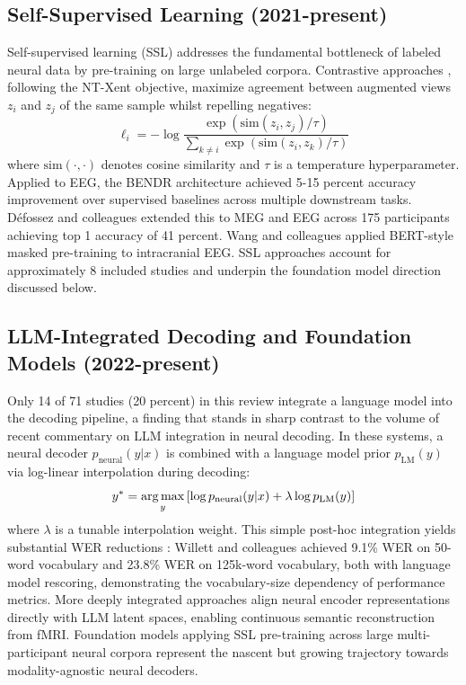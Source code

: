 \subsection{Self-Supervised Learning (2021-present)}

Self-supervised learning (SSL) addresses the fundamental bottleneck of labeled neural data by pre-training on large unlabeled corpora. Contrastive approaches \cite{Chen2020}, following the NT-Xent objective, maximize agreement between augmented views $z_i$ and $z_j$ of the same sample whilst repelling negatives:
\begin{equation}
\ell_i = -\log \frac{\exp(\text{sim}(z_i, z_j) / \tau)}{\sum_{k \neq i} \exp(\text{sim}(z_i, z_k) / \tau)}
\end{equation}
where $\text{sim}(\cdot, \cdot)$ denotes cosine similarity and $\tau$ is a temperature hyperparameter. Applied to EEG, the BENDR architecture \cite{Kostas2021} achieved 5-15 percent accuracy improvement over supervised baselines across multiple downstream tasks. Défossez and colleagues \cite{Defossez2023} extended this to MEG and EEG across 175 participants achieving top 1 accuracy of 41 percent. Wang and colleagues \cite{Wang2023BrainBERT} applied BERT-style masked pre-training to intracranial EEG. SSL approaches account for approximately 8 included studies and underpin the foundation model direction discussed below.

\subsection{LLM-Integrated Decoding and Foundation Models (2022-present)}

Only 14 of 71 studies (20 percent) in this review integrate a language model into the decoding pipeline, a finding that stands in sharp contrast to the volume of recent commentary on LLM integration in neural decoding. In these systems, a neural decoder $p_{\text{neural}}(y|x)$ is combined with a language model prior $p_{\text{LM}}(y)$ via log-linear interpolation during decoding:
\begin{equation}
y^* = \operatorname*{arg\,max}_y \left[ \log p_{\text{neural}}(y|x) + \lambda \log p_{\text{LM}}(y) \right]
\end{equation}
where $\lambda$ is a tunable interpolation weight. This simple post-hoc integration yields substantial WER reductions \cite{Kaplan2020}: Willett and colleagues \cite{Willett2023} achieved 9.1\% WER on 50-word vocabulary and 23.8\% WER on 125k-word vocabulary, both with language model rescoring, demonstrating the vocabulary-size dependency of performance metrics. More deeply integrated approaches \cite{Tang2023Semantic,Ye2025} align neural encoder representations directly with LLM latent spaces, enabling continuous semantic reconstruction from fMRI. Foundation models applying SSL pre-training across large multi-participant neural corpora \cite{Wang2023BrainBERT,Yuan2024} represent the nascent but growing trajectory towards modality-agnostic neural decoders.

